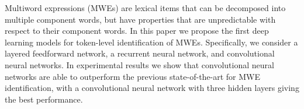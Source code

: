 Multiword expressions (MWEs) are lexical items that can be decomposed into multiple component words, but have properties that are unpredictable with respect to their component words. In this paper we propose the first deep learning models for token-level identification of MWEs. Specifically, we consider a layered feedforward network, a recurrent neural network, and convolutional neural networks. In experimental results we show that convolutional neural networks are able to outperform the previous state-of-the-art for MWE identification, with a convolutional neural network with three hidden layers giving the best performance.
